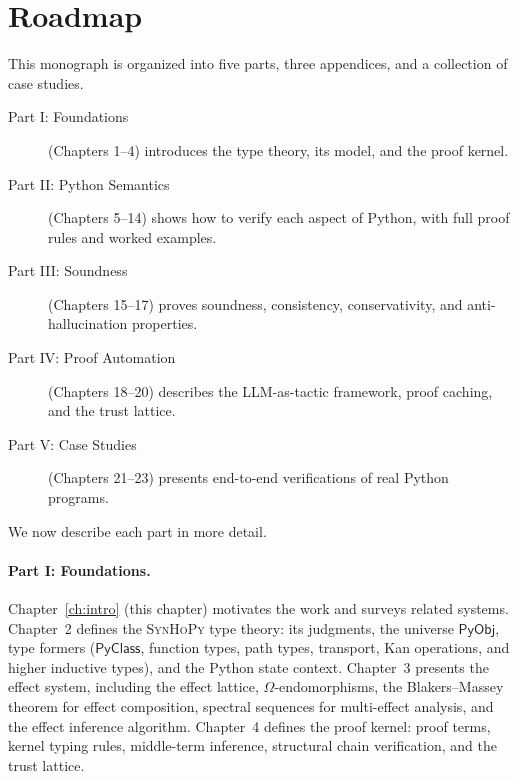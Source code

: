 \documentclass[11pt,a4paper]{report}
\theoremstyle{definition}
\theoremstyle{plain}
\newcommand{\PyObj}{\mathsf{PyObj}}
\newcommand{\PyClass}{\mathsf{PyClass}}
\newcommand{\synhopy}{\textsc{SynHoPy}}
\begin{document}
\section{Roadmap}
\label{sec:roadmap}

This monograph is organized into five parts, three appendices, and a
collection of case studies.

\begin{description}
  \item[Part I: Foundations] (Chapters 1--4) introduces the type theory, its model,
    and the proof kernel.
  \item[Part II: Python Semantics] (Chapters 5--14) shows how to verify each
    aspect of Python, with full proof rules and worked examples.
  \item[Part III: Soundness] (Chapters 15--17) proves soundness, consistency,
    conservativity, and anti-hallucination properties.
  \item[Part IV: Proof Automation] (Chapters 18--20) describes the LLM-as-tactic
    framework, proof caching, and the trust lattice.
  \item[Part V: Case Studies] (Chapters 21--23) presents end-to-end verifications
    of real Python programs.
\end{description}

\noindent We now describe each part in more detail.

\paragraph{Part I: Foundations.}
Chapter~\ref{ch:intro} (this chapter) motivates the work and surveys related
systems.  Chapter~2 defines the \synhopy{} type theory: its judgments, the
universe $\PyObj$, type formers ($\PyClass$, function types, path types,
transport, Kan operations, and higher inductive types), and the Python state
context.  Chapter~3 presents the effect system, including the effect lattice,
$\Omega$-endomorphisms, the Blakers--Massey theorem for effect composition,
spectral sequences for multi-effect analysis, and the effect inference
algorithm.  Chapter~4 defines the proof kernel: proof terms, kernel typing
rules, middle-term inference, structural chain verification, and the trust
lattice.
\end{document}
